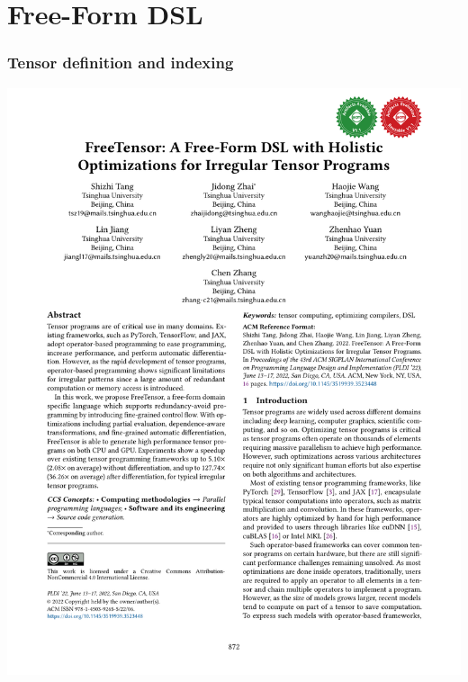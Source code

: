 \documentclass[12pt,aspectratio=169]{beamer}
\begin{document}
    \section{Free-Form DSL}

    \begin{frame}
        \frametitle{Tensor definition and indexing}

        \centering
        \includegraphics[page=4,trim=10.5cm 6.5cm 2cm 17cm,clip]{paper.pdf}
    \end{frame}
\end{document}
